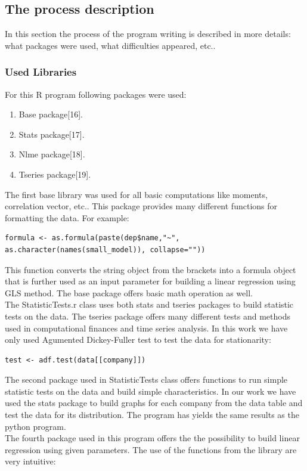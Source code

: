 \documentclass{article}
\begin{document}
\subsection{The process description}
In this section the process of the program writing is described in more details: what packages were used, what difficulties appeared, etc..
\subsubsection{Used Libraries}
For this R program following packages were used:
\begin{enumerate}
    \item Base package[16].
    \item Stats package[17].
    \item Nlme package[18].
    \item Tseries package[19].
\end{enumerate}
The first base library was used for all basic computations like moments, correlation vector, etc.. This package provides many different functions for formatting the data. For example:
\begin{verbatim}
formula <- as.formula(paste(dep$name,"~", as.character(names(small_model)), collapse=""))
\end{verbatim}
This function converts the string object from the brackets into a formula object that is further used as an input parameter for building a linear regression using GLS method. The base package offers basic math operation as well.\\
The StatisticTests.r class uses both stats and tseries packages to build statistic tests on the data. The tseries package offers many different tests and methods used in computational finances and time series analysis. In this work we have only used Agumented Dickey-Fuller test to test the data for stationarity:
\begin{verbatim}
test <- adf.test(data[[company]])
\end{verbatim}
The second package used in StatisticTests class offers functions to run simple statistic tests on the data and build simple characteristics. In our work we have used the stats package to build graphs for each company from the data table and test the data for its distribution. The program has yields the same results as the python program.\\
The fourth package used in this program offers the the possibility to build linear regression using given parameters. The use of the functions from the library are very intuitive:
\end{document}
